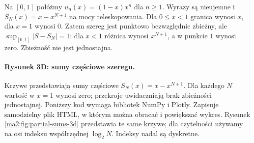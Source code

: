 \begin{przyklad}
\label{ma2:ex:pointwise-absolute-not-uniform}
Na $[0,1]$ połóżmy $u_n(x)=(1-x)x^n$ dla $n\ge1$.
Wyrazy są nieujemne i
$S_N(x)=x-x^{N+1}$ na mocy teleskopowania.
Dla $0\le x<1$ granica wynosi $x$, dla $x=1$
wynosi $0$. Zatem szereg jest punktowo bezwzględnie
zbieżny, ale $\sup_{[0,1]}|S-S_N|=1$:
dla $x<1$ różnica wynosi $x^{N+1}$, a w punkcie
$1$ wynosi zero. Zbieżność nie jest jednostajna.
\end{przyklad}

\paragraph{Rysunek 3D: sumy częściowe szeregu.}
Krzywe przedstawiają sumy częściowe $S_N(x)=x-x^{N+1}$.
Dla każdego $N$ wartość w $x=1$ wynosi zero;
przekroje uwidaczniają brak zbieżności jednostajnej.
Poniższy kod wymaga bibliotek NumPy i Plotly. Zapisuje samodzielny
plik HTML, w którym można obracać i powiększać wykres.
Rysunek \ref{ma2:fig:partial-sums-3d} przedstawia te same
krzywe; dla czytelności używamy na osi indeksu współrzędnej
$\log_2N$. Indeksy nadal są dyskretne.

